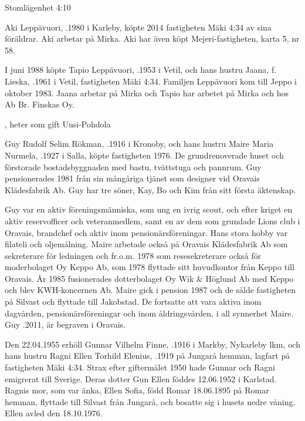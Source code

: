 Stomlägenhet 4:10


Aki Leppävuori, .1980 i Karleby, köpte 2014 fastigheten Mäki 4:34 av sina föräldrar. Aki arbetar på Mirka. Aki har även köpt Mejeri-fastigheten, karta 5, nr 58.\jhvspace{}


I juni 1988 köpte Tapio Leppävuori, .1953 i Vetil, och	hans hustru Jaana, f. Lieska, .1961 i Vetil, fastigheten Mäki 4:34. Familjen Leppävuori kom till Jeppo i oktober 1983. Jaana arbetar på Mirka och Tapio har arbetet på Mirka och hos Ab Br. Finskas Oy.
\begin{jhchildren}
  \item {}
  \item {}, heter som gift Uusi-Pohdola
\end{jhchildren}


Guy Rudolf Selim Rökman, .1916 i Kronoby, och hans hustru Maire Maria Nurmela, .1927 i Salla, köpte fastigheten 1976. De grundrenoverade huset och förstorade bostadsbyggnaden med bastu, tvättstuga och pannrum. Guy pensionerades 1981 från sin mångåriga tjänst som designer vid Oravais Klädesfabrik Ab. Guy har tre söner, Kay, Bo och Kim från sitt första äktenskap.

Guy var en aktiv föreningsmänniska, som ung en ivrig scout, och efter kriget en aktiv reservofficer och veteranmedlem, samt en av dem som 	grundade Lions club i Oravais, brandchef och aktiv inom pensionärsföreningar. Hans stora hobby var filateli och oljemålning.	Maire arbetade också på Oravais Klädesfabrik Ab som sekreterare för ledningen och fr.o.m. 1978 som resesekreterare också för moderbolaget Oy Keppo Ab, som 1978 flyttade sitt huvudkontor från Keppo till Oravais. År 1985 fusionerades dotterbolaget Oy Wik \& Höglund Ab med Keppo och blev KWH-koncernen Ab. Maire gick i pension 1987 och de sålde fastigheten på Silvast och flyttade till Jakobstad. De fortsatte att vara aktiva inom	dagvården, pensionärsföreningar och inom åldringsvården, i all synnerhet Maire. Guy .2011, är begraven i Oravais.


Den 22.04.1955 erhöll Gunnar Vilhelm Finne, .1916 i Markby, Nykarleby lkm, och hans hustru Ragni Ellen Torhild Elenius, .1919 på Jungarå hemman, lagfart på fastigheten Mäki 4:34. Strax efter giftermålet 1950 hade Gunnar och Ragni emigrerat till Sverige. Deras dotter Gun Ellen föddes 12.06.1952 i Karlstad. Ragnis mor, som var änka, Ellen Sofia, född Romar 18.06.1895 på Romar hemman, flyttade till Silvast från Jungarå, och bosatte sig i husets nedre våning. Ellen avled den 18.10.1976.

